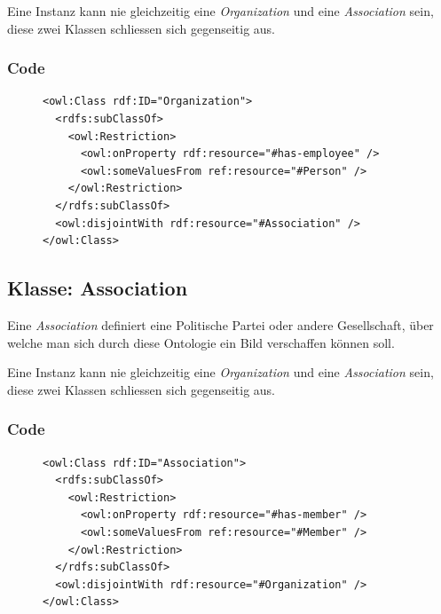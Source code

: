 \documentclass[
    11pt,
    latin1,
    a4paper,
    oneside
]{scrreprt}
\begin{document}
Eine Instanz kann nie gleichzeitig eine \emph{Organization} und eine \emph{Association} sein, diese zwei Klassen schliessen sich gegenseitig aus.

\subsubsection{Code} \label{sec:class_organization_code}

\begin{figure}[H]
 \lstset{language=XML}
 \begin{lstlisting}[label=owl:organization,caption={Die Klasse \emph{Organization} definiert einen Arbeitgeben, meistens ein Medienhaus}]
<owl:Class rdf:ID="Organization">
  <rdfs:subClassOf>
    <owl:Restriction>
      <owl:onProperty rdf:resource="#has-employee" />
      <owl:someValuesFrom ref:resource="#Person" />
    </owl:Restriction>
  </rdfs:subClassOf>
  <owl:disjointWith rdf:resource="#Association" />
</owl:Class>
 \end{lstlisting}
\end{figure}


\subsection{Klasse: Association} \label{sec:class_association}

Eine \emph{Association} definiert eine Politische Partei oder andere Gesellschaft, \"uber welche man sich durch diese Ontologie ein Bild verschaffen k\"onnen soll.

Eine Instanz kann nie gleichzeitig eine \emph{Organization} und eine \emph{Association} sein, diese zwei Klassen schliessen sich gegenseitig aus.

\subsubsection{Code} \label{sec:class_association_code}

\begin{figure}[H]
 \lstset{language=XML}
 \begin{lstlisting}[label=owl:association,caption={Eine \emph{Association} ist eine politische Partei oder eine andere Gesellschaft}]
<owl:Class rdf:ID="Association">
  <rdfs:subClassOf>
    <owl:Restriction>
      <owl:onProperty rdf:resource="#has-member" />
      <owl:someValuesFrom ref:resource="#Member" />
    </owl:Restriction>
  </rdfs:subClassOf>
  <owl:disjointWith rdf:resource="#Organization" />
</owl:Class>
 \end{lstlisting}
\end{figure}
\end{document}
